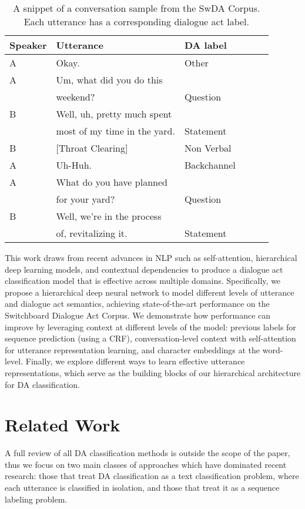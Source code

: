 \documentclass[11pt,a4paper]{article}
\begin{document}
\begin{table}[t!]
\begin{center}
\small
\begin{tabular}{llllll}
\hline \bf Speaker & \bf Utterance & \bf DA label \\  \hline 
A & Okay. & Other\\
A & Um, what did you do this \\
& weekend? & Question \\
B & Well, uh, pretty much spent\\
& most of my time in the yard. & Statement\\
B & [Throat Clearing] & Non Verbal\\
A & Uh-Huh. & Backchannel\\
A & What do you have planned \\
& for your yard? & Question\\
B & Well, we're in the process\\
& of, revitalizing it. & Statement\\ 
\hline
\end{tabular}
\end{center}
\caption{\label{corpus-examples}  A snippet of a conversation sample from the SwDA Corpus. Each utterance has a corresponding dialogue act label.}
\end{table}

This work draws from recent advances in NLP such as self-attention, hierarchical deep learning models, and contextual dependencies to produce a dialogue act classification model that is effective across multiple domains.  
Specifically, we propose a hierarchical deep neural network to model different levels of utterance and dialogue act semantics, achieving state-of-the-art performance on the Switchboard Dialogue Act Corpus. We demonstrate how performance can improve by leveraging context at different levels of the model: previous labels for sequence prediction (using a CRF), conversation-level context with self-attention for utterance representation learning, and character embeddings at the word-level. Finally, we explore different ways to learn effective utterance representations, which serve as the building blocks of our hierarchical architecture for DA classification.  








\section{Related Work}
\label{ssec:related-work}
A full review of all DA classification methods is outside the scope of the paper, thus we focus on two main classes of approaches which have dominated recent research: those that treat DA classification as a text classification problem, where each utterance is classified in isolation, and those that treat it as a  sequence labeling problem. 
\end{document}
